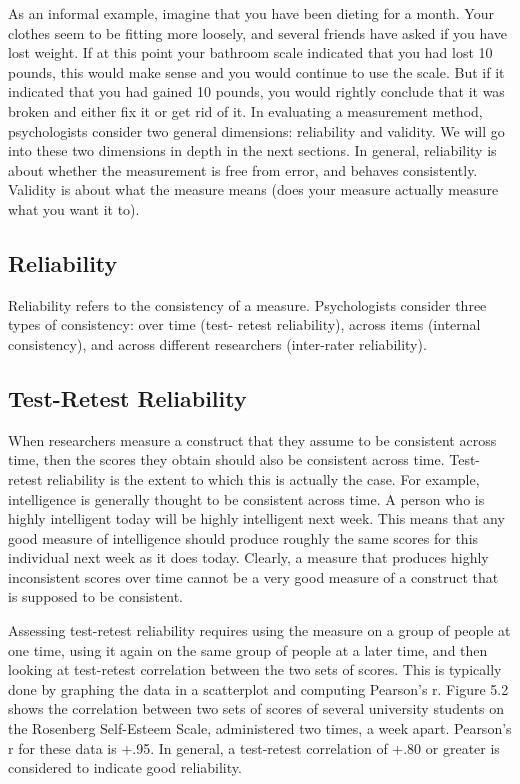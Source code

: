 As an informal example, imagine that you have been dieting for a month. Your clothes seem to be fitting more loosely, and several friends have asked if you have lost weight. If at this point your bathroom scale indicated that you had lost 10 pounds, this would make sense and you would continue to use the scale. But if it indicated that you had gained 10 pounds, you would rightly conclude that it was broken and either fix it or get rid of it. In evaluating a measurement method, psychologists consider two general dimensions: reliability and validity. We will go into these two dimensions in depth in the next sections. In general, reliability is about whether the measurement is free from error, and behaves consistently. Validity is about what the measure means (does your measure actually measure what you want it to).

\subsection{Reliability}

Reliability refers to the consistency of a measure. Psychologists consider three types of consistency: over time (test- retest reliability), across items (internal consistency), and across different researchers (inter-rater reliability).

\subsection{Test-Retest Reliability}


When researchers measure a construct that they assume to be consistent across time, then the scores they obtain should also be consistent across time. Test-retest reliability is the extent to which this is actually the case. For example, intelligence is generally thought to be consistent across time. A person who is highly intelligent today will be highly intelligent next week. This means that any good measure of intelligence should produce roughly the same scores for this individual next week as it does today. Clearly, a measure that produces highly inconsistent scores over time cannot be a very good measure of a construct that is supposed to be consistent.

Assessing test-retest reliability requires using the measure on a group of people at one time, using it again on the same group of people at a later time, and then looking at test-retest correlation between the two sets of scores. This is typically done by graphing the data in a scatterplot and computing Pearson's r. Figure 5.2 shows the correlation between two sets of scores of several university students on the Rosenberg Self-Esteem Scale, administered two times, a week apart. Pearson's r for these data is +.95. In general, a test-retest correlation of +.80 or greater is considered to indicate good reliability.

